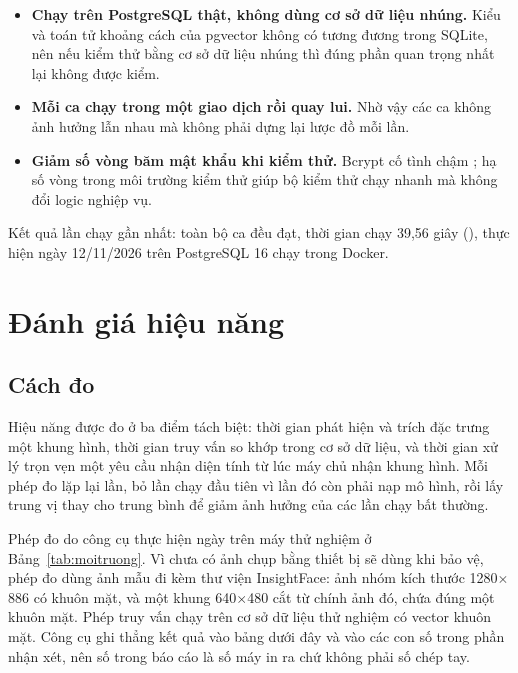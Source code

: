 \begin{itemize}[leftmargin=1.6em, itemsep=3pt]
  \item \textbf{Chạy trên PostgreSQL thật, không dùng cơ sở dữ liệu nhúng.}
        Kiểu  và toán tử khoảng cách của pgvector
        không có tương đương trong SQLite, nên nếu kiểm thử bằng cơ sở dữ
        liệu nhúng thì đúng phần quan trọng nhất lại không được kiểm.
  \item \textbf{Mỗi ca chạy trong một giao dịch rồi quay lui.} Nhờ vậy các ca
        không ảnh hưởng lẫn nhau mà không phải dựng lại lược đồ mỗi lần.
  \item \textbf{Giảm số vòng băm mật khẩu khi kiểm thử.} Bcrypt cố tình chậm \cite{Provos1999Bcrypt};
        hạ số vòng trong môi trường kiểm thử giúp bộ kiểm thử chạy nhanh mà
        không đổi logic nghiệp vụ.
\end{itemize}

Kết quả lần chạy gần nhất: toàn bộ \FsoTest{} ca đều đạt, thời gian chạy
39,56 giây (), thực hiện ngày 12/11/2026 trên
PostgreSQL 16 chạy trong Docker.

\section{Đánh giá hiệu năng}
\label{sec:hieunang}

\subsection{Cách đo}

Hiệu năng được đo ở ba điểm tách biệt: thời gian phát hiện và trích đặc trưng
một khung hình, thời gian truy vấn so khớp trong cơ sở dữ liệu, và thời gian
xử lý trọn vẹn một yêu cầu nhận diện tính từ lúc máy chủ nhận khung hình. Mỗi
phép đo lặp lại \HnSoLan{} lần, bỏ lần chạy đầu tiên vì lần đó còn phải nạp mô
hình, rồi lấy trung vị thay cho trung bình để giảm ảnh hưởng của các lần chạy
bất thường.

Phép đo do công cụ  thực hiện ngày
\HnNgayDo{} trên máy thử nghiệm ở Bảng~\ref{tab:moitruong}. Vì chưa có ảnh
chụp bằng thiết bị sẽ dùng khi bảo vệ, phép đo dùng ảnh mẫu đi kèm thư viện
InsightFace: ảnh nhóm  kích thước 1280$\times$886 có \HnSoMat{}
khuôn mặt, và một khung 640$\times$480 cắt từ chính ảnh đó, chứa đúng một khuôn
mặt. Phép truy vấn chạy trên cơ sở dữ liệu thử nghiệm có \HnSoVector{} vector
khuôn mặt. Công cụ ghi thẳng kết quả vào bảng dưới đây và vào các con số trong
phần nhận xét, nên số trong báo cáo là số máy in ra chứ không phải số chép tay.

